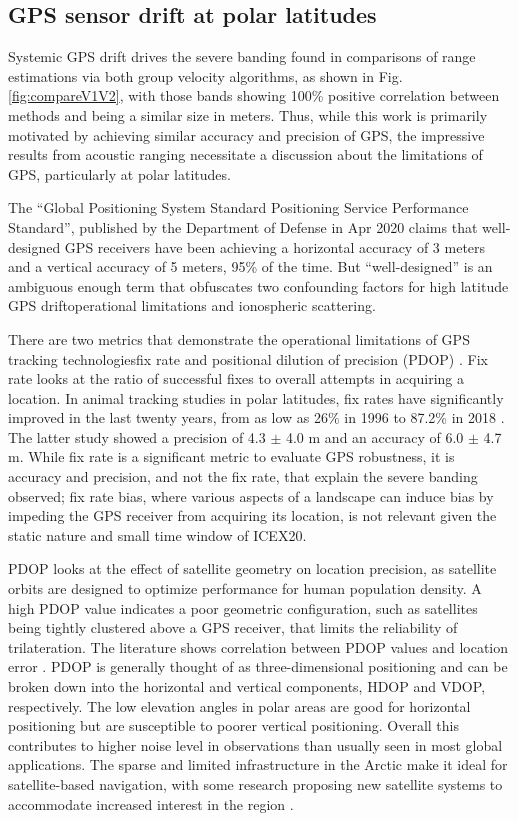\FloatBarrier
\subsection{GPS sensor drift at polar latitudes}

Systemic GPS drift drives the severe banding found in comparisons of range estimations via both group velocity algorithms, as shown in Fig. \ref{fig:compareV1V2}, with those bands showing 100\% positive correlation between methods and being a similar size in meters.
Thus, while this work is primarily motivated by achieving similar accuracy and precision of GPS, the impressive results from acoustic ranging necessitate a discussion about the limitations of GPS, particularly at polar latitudes.

The ``Global Positioning System Standard Positioning Service Performance Standard'', published by the Department of Defense in Apr 2020 claims that well-designed GPS receivers have been achieving a horizontal accuracy of 3 meters and a vertical accuracy of 5 meters, 95\% of the time.
But ``well-designed'' is an ambiguous enough term that obfuscates two confounding factors for high latitude GPS drift\textemdash operational limitations and ionospheric scattering.

There are two metrics that demonstrate the operational limitations of GPS tracking technologies\textemdash fix rate and positional dilution of precision (PDOP) \citep{swanlund_gps_2016}.
Fix rate looks at the ratio of successful fixes to overall attempts in acquiring a location.
In animal tracking studies in polar latitudes, fix rates have significantly improved in the last twenty years, from as low as 26\% in 1996 \citep{moen_effects_1996} to 87.2\% in 2018 \citep{jung_accuracy_2018}.
The latter study showed a precision of 4.3 $\pm$ 4.0 m and an accuracy of 6.0 $\pm$ 4.7 m.
While fix rate is a significant metric to evaluate GPS robustness, it is accuracy and precision, and not the fix rate, that explain the severe banding observed; fix rate bias, where various aspects of a landscape can induce bias by impeding the GPS receiver from acquiring its location, is not relevant given the static nature and small time window of ICEX20.

PDOP looks at the effect of satellite geometry on location precision, as satellite orbits are designed to optimize performance for human population density.
A high PDOP value indicates a poor geometric configuration, such as satellites being tightly clustered above a GPS receiver, that limits the reliability of trilateration.
The literature shows correlation between PDOP values and location error \citep{swanlund_gps_2016}.
PDOP is generally thought of as three-dimensional positioning and can be broken down into the horizontal and vertical components, HDOP and VDOP, respectively.
The low elevation angles in polar areas are good for horizontal positioning but are susceptible to poorer vertical positioning.
Overall this contributes to higher noise level in observations than usually seen in most global applications.
The sparse and limited infrastructure in the Arctic make it ideal for satellite-based navigation, with some research proposing new satellite systems to accommodate increased interest in the region \citep{reid_gnss_2016}.

